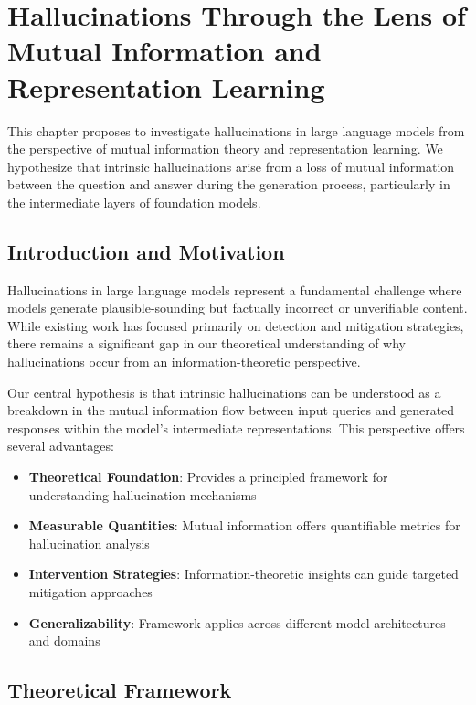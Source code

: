 \chapter{Hallucinations Through the Lens of Mutual Information and Representation Learning}
\label{chp:hallucinations}

This chapter proposes to investigate hallucinations in large language models from the perspective of mutual information theory and representation learning. We hypothesize that intrinsic hallucinations arise from a loss of mutual information between the question and answer during the generation process, particularly in the intermediate layers of foundation models.

\section{Introduction and Motivation}
\label{sec:hall_intro}

Hallucinations in large language models represent a fundamental challenge where models generate plausible-sounding but factually incorrect or unverifiable content. While existing work has focused primarily on detection and mitigation strategies, there remains a significant gap in our theoretical understanding of why hallucinations occur from an information-theoretic perspective.

Our central hypothesis is that intrinsic hallucinations can be understood as a breakdown in the mutual information flow between input queries and generated responses within the model's intermediate representations. This perspective offers several advantages:

\begin{itemize}
    \item \textbf{Theoretical Foundation}: Provides a principled framework for understanding hallucination mechanisms
    \item \textbf{Measurable Quantities}: Mutual information offers quantifiable metrics for hallucination analysis
    \item \textbf{Intervention Strategies}: Information-theoretic insights can guide targeted mitigation approaches
    \item \textbf{Generalizability}: Framework applies across different model architectures and domains
\end{itemize}

\section{Theoretical Framework}
\label{sec:hall_theory}

